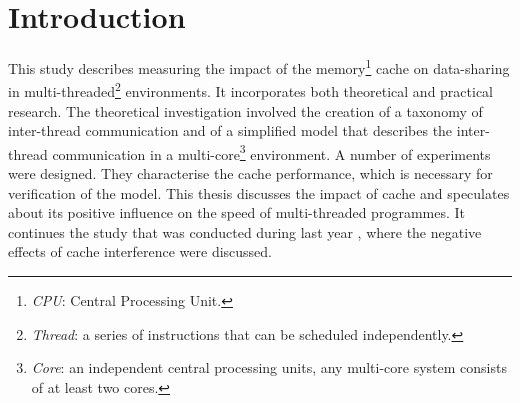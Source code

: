 

\chapter{Introduction}

\ifpdf
    \graphicspath{{1_introduction/figures/PNG/}{1_introduction/figures/PDF/}{1_introduction/figures/}}
\else
    \graphicspath{{1_introduction/figures/EPS/}{1_introduction/figures/}}
\fi



This study describes measuring the impact of the memory\footnote{\textit{CPU}: Central Processing Unit.} cache on data-sharing in multi-threaded\footnote{\textit{Thread}: a series of instructions that can be scheduled independently.} environments. It incorporates both theoretical and practical research. The theoretical investigation involved the creation of a taxonomy of inter-thread communication and of a simplified model that describes the inter-thread communication in a multi-core\footnote{\textit{Core}: an independent central processing units, any multi-core system consists of at least two cores.} environment. A number of experiments were designed. They characterise the cache performance, which is necessary for verification of the model. This thesis discusses the impact of cache and speculates about its positive influence on the speed of multi-threaded programmes. It continues the study that was conducted during last year \cite{Bazilinskyy2013}, where the negative effects of cache interference were discussed.

